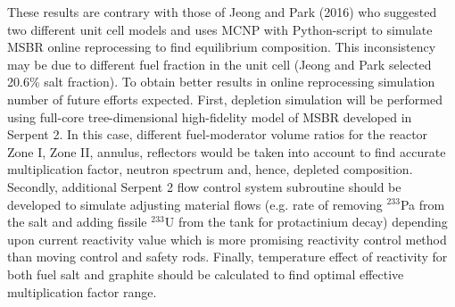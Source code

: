 \documentclass{anstrans}
\begin{document}
These results are contrary with those of Jeong and Park (2016) who suggested 
two different unit cell models and uses \gls{MCNP} with Python-script to 
simulate \gls{MSBR} online reprocessing to find equilibrium composition. This 
inconsistency may be due to different fuel fraction in the unit cell (Jeong and 
Park selected 20.6\% salt fraction). To obtain better results in online 
reprocessing simulation number of future efforts expected. First, depletion 
simulation will be performed using full-core tree-dimensional high-fidelity 
model of \gls{MSBR} developed in Serpent 2. In this case, different 
fuel-moderator volume ratios for the reactor Zone I, Zone II, annulus, 
reflectors would be taken into account to find accurate multiplication factor, 
neutron spectrum and, hence, depleted composition. Secondly, additional Serpent 
2 flow control system subroutine should be developed to simulate adjusting 
material flows (e.g. rate of removing $^{233}$Pa from the salt and adding 
fissile $^{233}$U from the tank for protactinium decay) depending upon current 
reactivity value which is more promising reactivity control method than moving 
control and safety rods. Finally, temperature effect of reactivity for both 
fuel salt and graphite should be calculated to find optimal effective 
multiplication factor range. 



\end{document}
